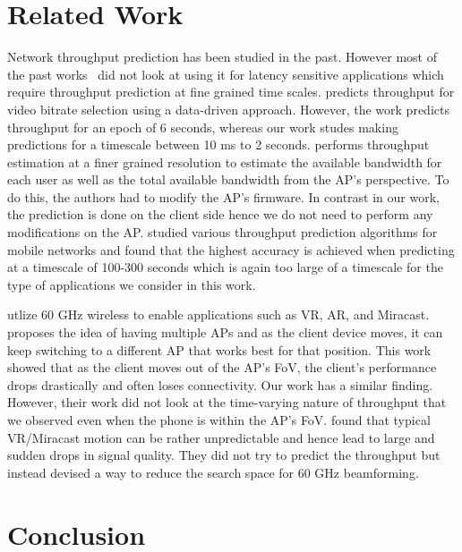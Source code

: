 \documentclass[sigconf,anonymous]{acmart}
\begin{document}
\section{Related Work} %

Network throughput prediction has been studied in the past. However most of
the past works~\cite{mirza:sigmetrics2007, bui:ewc2014,
  liu:globecom2015} did not look at using it for latency sensitive
applications which require throughput prediction at fine grained time
scales.
\cite{sun:sigcomm2016} predicts
throughput for video bitrate selection using a data-driven
approach. However, the work predicts throughput for an epoch of 6 seconds,
whereas our work studes making predictions for a timescale between 10 ms to 2
seconds.
\cite{liu:atc2020} performs throughput estimation at a finer
grained resolution 
to estimate the available bandwidth for each user
as well as the total available bandwidth from the AP's perspective. To
do this, the authors had to modify the
AP's firmware. In contrast in our work, the prediction is done on the
client side hence we do not need to perform any modifications on the
AP.
\cite{liu:globecom2015} studied various throughput
prediction algorithms for mobile networks and found that 
the highest accuracy is achieved when predicting at a timescale of 100-300
seconds which is again too large of a timescale for the
type of applications we consider in this work.

\cite{wei:mobicom2017,zhou:infocom2018} 
utlize 60 GHz wireless to enable applications such as VR, AR,
and Miracast.
\cite{wei:mobicom2017} proposes the idea of having
multiple APs and as the client device moves, it can keep switching to
a different AP that works best for that position. This work showed
that as the client moves out of the AP's FoV, the client's performance
drops drastically and often loses connectivity. Our work has a similar
finding. However, their work did not look at the time-varying
nature of throughput that we observed even when the phone is within
the AP's FoV.
\cite{zhou:infocom2018} found that typical VR/Miracast
motion can be rather unpredictable and hence lead to large and sudden
drops in signal quality. They did not try to predict the
throughput but instead devised a way to reduce the search space for 60
GHz beamforming.

\section{Conclusion}
\end{document}
